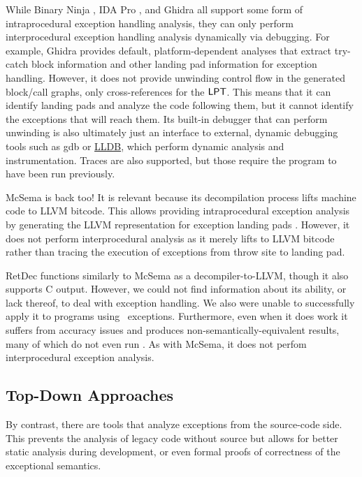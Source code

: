 While Binary Ninja \autocite{binary-ninja}, IDA Pro \autocite{ida}, and Ghidra \autocite{ghidra} all support some form of intraprocedural exception handling analysis, they can only perform interprocedural exception handling analysis dynamically via debugging.
For example, Ghidra provides default, platform-dependent analyses that extract try-catch block information and other landing pad information for exception handling.
However, it does not provide unwinding control flow in the generated block/call graphs, only cross-references for the $\operatorname{\mathsf{LPT}}$.
This means that it can identify landing pads and analyze the code following them, but it cannot identify the exceptions that will reach them.
Its built-in debugger that can perform unwinding is also ultimately just an interface to external, dynamic debugging tools such as \ac{gdb} or \href{https://lldb.llvm.org/}{LLDB},
which perform dynamic analysis and instrumentation. Traces are also supported,
but those require the program to have been run previously.

McSema \autocite{mcsema} is back too! It is relevant because its decompilation process lifts machine code to LLVM bitcode.
This allows providing intraprocedural exception analysis by generating the LLVM representation for exception landing pads \autocite{mcsema-exceptions}.
However, it does not perform interprocedural analysis as it merely lifts to LLVM bitcode rather than tracing the execution of exceptions from throw site to landing pad.

RetDec \autocite{retdec} functions similarly to McSema as a decompiler-to-LLVM, though it also supports C output.
However, we could not find information about its ability, or lack thereof, to deal with exception handling. We also were unable to successfully apply it to programs using \Cpp\ exceptions.
Furthermore, even when it does work it suffers from accuracy issues and produces non-semantically-equivalent results, many of which do not even run \autocite{foudree2019regsym}.
As with McSema, it does not perfom interprocedural exception analysis.

\subsection{Top-Down Approaches}
By contrast, there are tools that analyze exceptions from the source-code side.
This prevents the analysis of legacy code without source but allows for better static analysis during development, or even formal proofs of correctness of the exceptional semantics.

